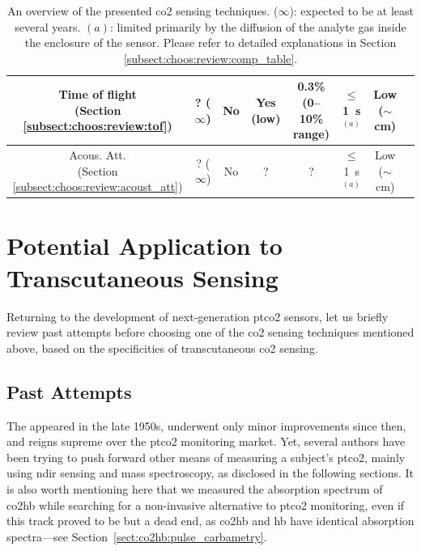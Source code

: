 {\begin{landscape}
\begin{table}
\begin{adjustbox}{center}
\begin{tabular}{c|c|c|c|c|c|c|c}
		\specialcell{Time of flight\\(Section \ref{subsect:choos:review:tof})} & ? ($\infty$) & No & Yes (low) & \specialcell{0.3\%\\ (0--10\% range)} & $\leq$1~s $^{(a)}$ & Low ($\sim$cm) & \cite{joos1993} \\ \hline
		
		\specialcell{Acous. Att.\\(Section \ref{subsect:choos:review:acoust_att})} & ? ($\infty$) & No & ? & ? & $\leq$1~s $^{(a)}$ & Low ($\sim$cm) & \cite{petculescu2006a, petculescu2006b}
		
	\end{tabular}
	\end{adjustbox}
	\caption[An overview of the presented \gls{co2} sensing techniques.]{An overview of the presented \gls{co2} sensing techniques. ($\infty$): expected to be at least several years. $(a)$: limited primarily by the diffusion of the analyte gas inside the enclosure of the sensor. Please refer to detailed explanations in Section \ref{subsect:choos:review:comp_table}.}
	\label{tab:choos:review:resume_techniques}
\end{table}
\end{landscape}
}

\section{Potential Application to Transcutaneous Sensing}\label{sect:choos:techno_choice}

Returning to the development of next-generation \gls{ptco2} sensors, let us briefly review past attempts before choosing one of the \gls{co2} sensing techniques mentioned above, based on the specificities of transcutaneous \gls{co2} sensing.

\subsection{Past Attempts}\label{subsect:choos:pot:past_attempts}

The \ssel{} appeared in the late 1950s, underwent only minor improvements since then, and reigns supreme over the \gls{ptco2} monitoring market\cite{severinghaus1986_3, mari2019}. Yet, several authors have been trying to push forward other means of measuring a subject's \gls{ptco2}, mainly using \gls{ndir} sensing and mass spectroscopy, as disclosed in the following sections. It is also worth mentioning here that we measured the absorption spectrum of \gls{co2hb} while searching for a non-invasive alternative to \gls{ptco2} monitoring, even if this track proved to be but a dead end, as \gls{co2hb} and \gls{hb} have identical absorption spectra---see Section~\ref{sect:co2hb:pulse_carbametry}.

